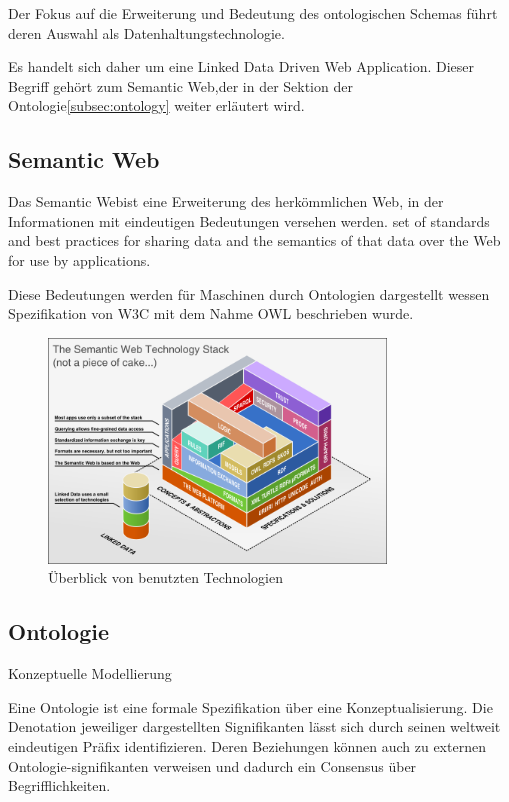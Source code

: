\documentclass[
12pt,
english,
ngerman,
headsepline,
twoside,
openright,
numbers=noenddot,version=first
]{scrreprt}
\begin{document}
Der Fokus auf die Erweiterung und Bedeutung des ontologischen Schemas führt deren Auswahl als Datenhaltungstechnologie. 

Es handelt sich daher um eine \glqq Linked Data Driven Web Application\grqq.%
Dieser Begriff gehört zum \glqq Semantic Web\grqq,der in der Sektion der Ontologie\ref{subsec:ontology} weiter erläutert wird.

\subsection{Semantic Web}

Das \glqq Semantic Web\grqq ist eine Erweiterung des herkömmlichen Web, in der Informationen mit eindeutigen Bedeutungen versehen werden\cite{ontoWhat2}.
set of standards and best practices for sharing data and the semantics of that data over the Web for use by applications\cite{sparqlLearn}.

Diese Bedeutungen werden für Maschinen durch Ontologien dargestellt wessen Spezifikation von W3C\cite{W3C} mit dem Nahme \acrfull{OWL} beschrieben wurde.

\begin{figure}[h]
	\centering
	\includegraphics[width=0.8\textwidth]{pics/semantic_web_technology_stack.png}
	\caption{Überblick von benutzten Technologien}
	\label{fig:semantic-web-stack}
\end{figure}

\subsection{Ontologie}{Konzeptuelle Modellierung}
\label{subsec:ontology}

Eine Ontologie ist eine formale Spezifikation über eine Konzeptualisierung\cite{ontoWhat}. Die Denotation jeweiliger dargestellten Signifikanten lässt sich durch seinen weltweit eindeutigen Präfix identifizieren. Deren Beziehungen können auch zu externen Ontologie-signifikanten verweisen und dadurch ein Consensus über Begrifflichkeiten. 
\end{document}
